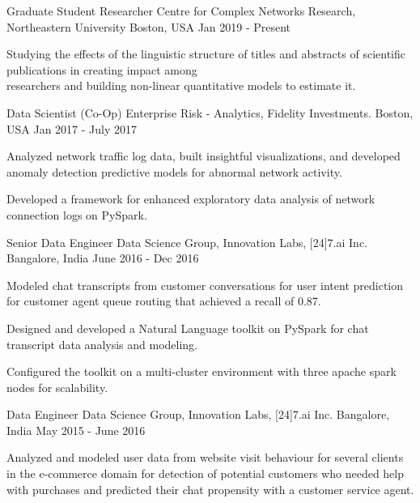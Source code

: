 \begin{cventries}
  \cventry
    {Graduate Student Researcher}
    {Centre for Complex Networks Research, Northeastern University}
    {Boston, USA}
    {Jan 2019 - Present}
    {
      \begin{cvitems}
        \item {Studying the effects of the linguistic structure of titles and abstracts of scientific publications in creating impact among \\ researchers and building non-linear quantitative models to estimate it.}
        \end{cvitems}
    }
  \cventry
    {Data Scientist (Co-Op)}
    {Enterprise Risk - Analytics, Fidelity Investments.}
    {Boston, USA}
    {Jan 2017 - July 2017}
    {
      \begin{cvitems}
        \item {Analyzed network traffic log data, built insightful visualizations, and developed anomaly detection predictive models
for abnormal network activity.}
        \item {Developed a framework for enhanced exploratory data analysis of network connection logs on PySpark.}
      \end{cvitems}
    }
  \cventry
    {Senior Data Engineer}
    {Data Science Group, Innovation Labs, [24]7.ai Inc.}
    {Bangalore, India}
    {June 2016 - Dec 2016}
    {
      \begin{cvitems}
        \item {Modeled chat transcripts from customer conversations for user intent prediction for customer agent queue routing that achieved a recall of 0.87.}
        \item {Designed and developed a Natural Language toolkit on PySpark for chat transcript data analysis and modeling.}
        \item {Configured the toolkit on a multi-cluster environment with three apache spark nodes for scalability.}
      \end{cvitems}
    }
  \cventry
    {Data Engineer}
    {Data Science Group, Innovation Labs, [24]7.ai Inc.}  
    {Bangalore, India}
    {May 2015 - June 2016}
    {
      \begin{cvitems}
        \item {Analyzed and modeled user data from website visit behaviour for several clients in the e-commerce domain for detection of potential customers who needed help with purchases and predicted their chat propensity with a customer service agent.}

\end{cvitems}}
\end{cventries}
